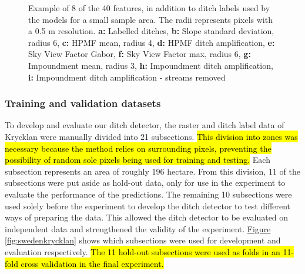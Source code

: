\documentclass[11pt, review]{elsarticle} %
\newcommand{\hlc}[2][yellow]{{%
    \colorlet{foo}{#1}%
    \sethlcolor{foo}\hl{#2}}%
}
\begin{document}
\begin{figure} [H]
{        }
    \caption{Example of 8 of the 40 features, in addition to ditch labels used by the models for a small sample area. The radii represents pixels with a 0.5 m resolution. \newline \textbf{a:} Labelled ditches, \textbf{b:} Slope standard deviation, radius 6, \textbf{c:} HPMF mean, radius 4, \textbf{d:} HPMF ditch amplification, \textbf{e:} Sky View Factor Gabor, \textbf{f:} Sky View Factor max, radius 6, \textbf{g:} Impoundment mean, radius 3, \textbf{h:} Impoundment ditch amplification, \textbf{i:} Impoundment ditch amplification - streams removed}
    \label{fig:features}
\end{figure}

\subsubsection{Training and validation datasets}
\label{trainingvalidationdatasets}
To develop and evaluate our ditch detector, the raster and ditch label data of Krycklan were manually divided into 21 subsections. \hlc{This division into zones was necessary because the method relies on surrounding pixels, preventing the possibility of random sole pixels being used for training and testing.} Each subsection represents an area of roughly 196 hectare. From this division, 11 of the subsections were put aside as hold-out data, only for use in the experiment to evaluate the performance of the predictions. The remaining 10 subsections were used solely before the experiment to develop the ditch detector to test different ways of preparing the data. This allowed the ditch detector to be evaluated on  independent data and  strengthened the validity of the experiment. \hyperref[fig:swedenkrycklan]{Figure} \ref{fig:swedenkrycklan} shows which subsections were used for development and evaluation respectively. \hlc{The 11 hold-out subsections were used as folds in an 11-fold cross validation in the final experiment.}
\end{document}
